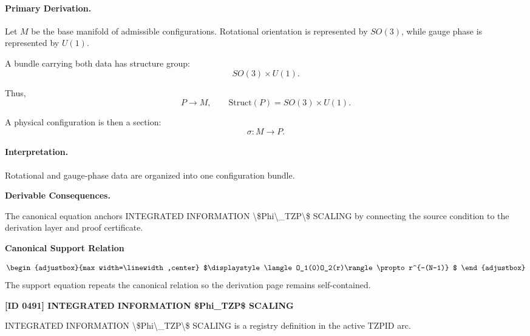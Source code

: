\paragraph{Primary Derivation.}
Let $M$ be the base manifold of admissible configurations. Rotational orientation is represented by $SO(3)$, while gauge phase is represented by $U(1)$.

A bundle carrying both data has structure group:
\begin{equation}
SO(3)\times U(1).
\end{equation}

Thus,
\begin{equation}
P\to M,
\qquad
\mathrm{Struct}(P)=SO(3)\times U(1).
\end{equation}

A physical configuration is then a section:
\begin{equation}
\boxed{
\sigma:M\to P.
}
\end{equation}

\paragraph{Interpretation.}
Rotational and gauge-phase data are organized into one configuration bundle.

\par\vspace{0.35em}
\noindent\textbf{Derivable Consequences.}\quad
\begingroup
\footnotesize
\raggedright
The canonical equation anchors INTEGRATED INFORMATION \textbackslash{}\$Phi\textbackslash{}\_TZP\textbackslash{}\$ SCALING by connecting the source condition to the derivation layer and proof certificate.
\par\endgroup

\noindent\textbf{Canonical Support Relation}\par
\[
\begin{adjustbox}{max width=\linewidth,center}
$\displaystyle
\langle O_1(0)O_2(r)\rangle\propto r^{-(N-1)}
$
\end{adjustbox}
\]
\noindent The support equation repeats the canonical relation so the derivation page remains self-contained.\par

\clearpage
\noindent\textbf{[ID 0491] INTEGRATED INFORMATION \$Phi\_TZP\$ SCALING}\par
\vspace{0.35em}
\begingroup\small
{}
INTEGRATED INFORMATION \textbackslash{}\$Phi\textbackslash{}\_TZP\textbackslash{}\$ SCALING is a registry definition in the active TZPID arc.

